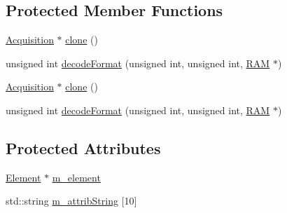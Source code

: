 \subsection*{Protected Member Functions}
\begin{DoxyCompactItemize}
\item 
\hyperlink{classAcquisition_1_1Acquisition}{Acquisition} $\ast$ \hyperlink{classAcquisition_a4b1b690ef27f20b3e1ad9383f2f57628}{clone} ()
\item 
unsigned int \hyperlink{classAcquisition_a76fe7c020f7097e5d479867ba783ba31}{decode\+Format} (unsigned int, unsigned int, \hyperlink{classRAM}{R\+AM} $\ast$)
\item 
\hyperlink{classAcquisition_1_1Acquisition}{Acquisition} $\ast$ \hyperlink{classAcquisition_a4b1b690ef27f20b3e1ad9383f2f57628}{clone} ()
\item 
unsigned int \hyperlink{classAcquisition_a76fe7c020f7097e5d479867ba783ba31}{decode\+Format} (unsigned int, unsigned int, \hyperlink{classRAM}{R\+AM} $\ast$)
\end{DoxyCompactItemize}
\subsection*{Protected Attributes}
\begin{DoxyCompactItemize}
\item 
\hyperlink{classElement}{Element} $\ast$ \hyperlink{classProcessus_aa9d24d53c3e52f36786cabb5d8e296e7}{m\+\_\+element}
\item 
std\+::string \hyperlink{classAttrib_a3414521d7a82476e874b25a5407b5e63}{m\+\_\+attrib\+String} \mbox{[}10\mbox{]}
\end{DoxyCompactItemize}
